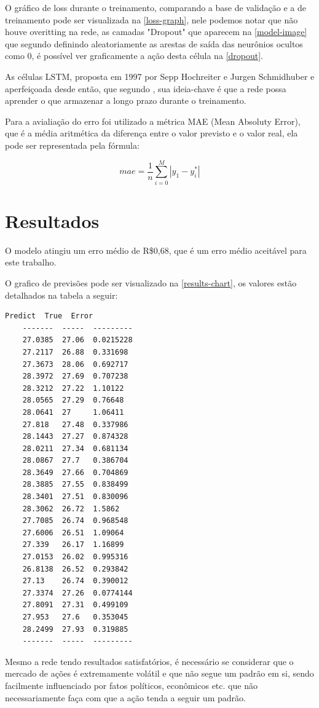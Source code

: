 \documentclass[
	article,			%
	11pt,				%
	oneside,			%
	a4paper,			%
	english,			%
	brazil,				%
	sumario=tradicional
	]{abntex2}
\begin{document}
O gráfico de loss durante o treinamento, comparando a base de validação e a de treinamento pode ser visualizada na \autoref{loss-graph}, nele podemos notar que não houve overitting na rede, as camadas "Dropout" que aparecem na \autoref{model-image} que segundo  definindo aleatoriamente as arestas de saída das neurônios ocultos como 0, é possível ver graficamente a ação desta célula na \autoref{dropout}.

As células LSTM, proposta em 1997 por Sepp Hochreiter e Jurgen Schmidhuber e aperfeiçoada desde então, que segundo , sua ideia-chave é que a rede possa aprender o que armazenar a longo prazo durante o treinamento.

Para a avialiação do erro foi utilizado a métrica MAE (Mean Absoluty Error), que é a média aritmética da diferença entre o valor previsto e o valor real, ela pode ser representada pela fórmula:

\begin{equation}
mae = \frac{1}{n}\sum_{i=0}^M |{y_1 - y^*_i}|
\end{equation}

\section{Resultados}

O modelo atingiu um erro médio de R\$0,68, que é um erro médio aceitável para este trabalho.

O grafico de previsões pode ser visualizado na \autoref{results-chart}, os valores estão detalhados na tabela a seguir:

\begin{verbatim}
Predict  True  Error
	-------  -----  ---------
	27.0385  27.06  0.0215228
	27.2117  26.88  0.331698
	27.3673  28.06  0.692717
	28.3972  27.69  0.707238
	28.3212  27.22  1.10122
	28.0565  27.29  0.76648
	28.0641  27     1.06411
	27.818   27.48  0.337986
	28.1443  27.27  0.874328
	28.0211  27.34  0.681134
	28.0867  27.7   0.386704
	28.3649  27.66  0.704869
	28.3885  27.55  0.838499
	28.3401  27.51  0.830096
	28.3062  26.72  1.5862
	27.7085  26.74  0.968548
	27.6006  26.51  1.09064
	27.339   26.17  1.16899
	27.0153  26.02  0.995316
	26.8138  26.52  0.293842
	27.13    26.74  0.390012
	27.3374  27.26  0.0774144
	27.8091  27.31  0.499109
	27.953   27.6   0.353045
	28.2499  27.93  0.319885
	-------  -----  ---------
\end{verbatim}

Mesmo a rede tendo resultados satisfatórios, é necessário se considerar que o mercado de ações é extremamente volátil e que não segue um padrão em si, sendo facilmente influenciado por fatos políticos, econômicos etc. que não necessariamente faça com que a ação tenda a seguir um padrão.
\postextual
\end{document}
